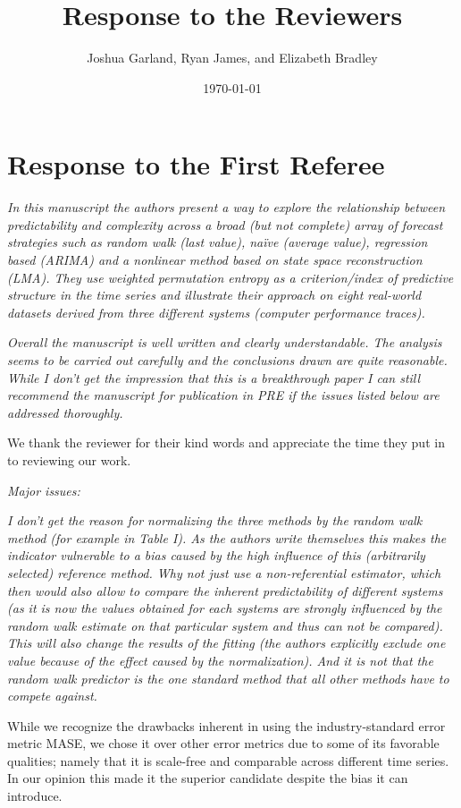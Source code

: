 \documentclass[12pt]{article}
\title{Response to the Reviewers}
\author{Joshua Garland, Ryan James, and Elizabeth Bradley}
\date{\today}
\begin{document}
\maketitle

\section*{Response to the First Referee}

\emph{In this manuscript the authors present a way to explore the relationship
between predictability and complexity across a broad (but not complete) array of
forecast strategies such as random walk (last value), na\"ive (average value),
regression based (ARIMA) and a nonlinear method based on state space
reconstruction (LMA). They use weighted permutation entropy as a criterion/index
of predictive structure in the time series and illustrate their approach on
eight real-world datasets derived from three different systems (computer
performance traces).}

\emph{Overall the manuscript is well written and clearly understandable. The
analysis seems to be carried out carefully and the conclusions drawn are quite
reasonable. While I don't get the impression that this is a breakthrough paper I
can still recommend the manuscript for publication in PRE if the issues listed
below are addressed thoroughly.}

We thank the reviewer for their kind words and appreciate the time they put in
to reviewing our work.

\noindent\emph{Major issues:}

\emph{I don't get the reason for normalizing the three methods by the random
walk method (for example in Table I). As the authors write themselves this makes
the indicator vulnerable to a bias caused by the high influence of this
(arbitrarily selected) reference method. Why not just use a non-referential
estimator, which then would also allow to compare the inherent predictability of
different systems (as it is now the values obtained for each systems are
strongly influenced by the random walk estimate on that particular system and
thus can not be compared). This will also change the results of the fitting (the
authors explicitly exclude one value because of the effect caused by the
normalization). And it is not that the random walk predictor is the one standard
method that all other methods have to compete against.}

While we recognize the drawbacks inherent in using the industry-standard error
metric MASE, we chose it over other error metrics due to some of its favorable
qualities; namely that it is scale-free and comparable across different time
series. In our opinion this made it the superior candidate despite the bias it
can introduce.
\end{document}
